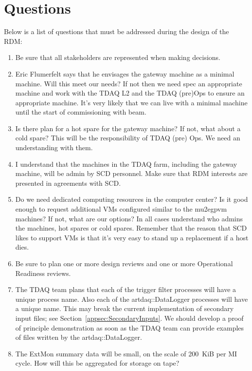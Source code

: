 \chapter{Questions}
\label{ch:questions}

Below is a list of questions that must be addressed during the design of the RDM:


\begin{enumerate}
  \item Be sure that all stakeholders are represented when making decisions.
  \item Eric Flumerfelt says that he envisages the gateway machine as a minimal machine.  Will this meet our needs?
    If not then we need spec an appropriate machine and work with the TDAQ L2 and the TDAQ (pre)Ops to ensure an appropriate
    machine. It's very likely that we can live with a minimal machine until the start of commissioning with beam.
  \item Is there plan for a hot spare for the gateway machine? If not, what about a cold spare?
    This will be the responsibility of TDAQ (pre) Ops.  We need an understanding with them.
  \item I understand that the machines in the TDAQ farm, including the gateway machine, will be admin by SCD personnel.  Make sure that
    RDM interests are presented in agreements with SCD.
  \item Do we need dedicated computing resources in the computer center? Is it good enough to request additional VMs configured similar to
    the mu2egpvm machines?  If not, what are our options?  In all cases understand who admins the machines, hot spares or cold spares.
    Remember that the reason that SCD likes to support VMs is that it's very easy to stand up a replacement if a host dies.
  \item Be sure to plan one or more design reviews and one or more Operational Readiness reviews.
  \item The TDAQ team plans that each of the trigger filter processes will have a unique process name.
    Also each of the {\code artdaq::DataLogger} processes will have a unique name.
    This may break the current \art implementation of secondary input files; see Section~\ref{appsec:SecondaryInputs}.
    We should develop a proof of principle demonstration as soon as the TDAQ team can provide examples of files written by
    the  {\code artdaq::DataLogger}.
  \item The ExtMon summary data will be small, on the scale of 200~KiB per MI cycle.  How will this be aggregated for storage on tape?

\end{enumerate}
